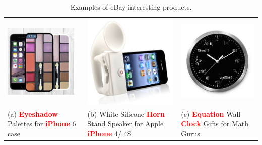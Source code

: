 \begin{table}[t]
\caption{Examples of eBay interesting products.}
\label{tab:ebay-interesting-products}
\begin{center}
\begin{tabular}{LLL}
\includegraphics[height=3.5cm]{figures/eyeshadow-iphone-case.jpg}&\includegraphics[height=4.5cm]{figures/horn-iphone-speaker.jpg}&\includegraphics[height=4.0cm]{figures/geeky-clock.jpg}\\
(a) \textcolor{red}{{\bf Eyeshadow}} Palettes for \textcolor{red}{{\bf iPhone}} 6 case & (b) White Silicone \textcolor{red}{{\bf Horn}} Stand Speaker for Apple \textcolor{red}{{\bf iPhone}} 4/ 4S& (c) \textcolor{red}{{\bf Equation}} Wall \textcolor{red}{{\bf Clock}} Gifts for Math Gurus\\
\end{tabular}
\end{center}
\end{table}